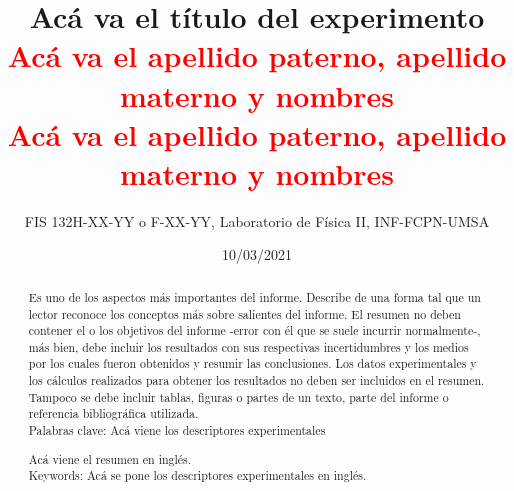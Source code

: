 \documentclass[11pt]{article}
\title{\textbf{Acá va el título del experimento}\\{\textcolor{red}{Acá va el apellido paterno, apellido materno y nombres\\Acá va el apellido paterno, apellido materno y nombres}}}
\author{FIS 132H-XX-YY o F-XX-YY, Laboratorio de Física II, INF-FCPN-UMSA}
\date{10/03/2021}
\begin{document}
\maketitle
{}
\begin{abstract}
\noindent Es uno de los aspectos más importantes del informe. Describe de una forma tal que un lector reconoce los conceptos más sobre salientes del informe. El resumen no deben contener el o los objetivos del informe -error con él que se suele incurrir normalmente-, más bien, debe incluir los resultados con sus respectivas incertidumbres y los medios por los cuales fueron obtenidos y resumir las conclusiones. Los datos experimentales y los cálculos realizados para obtener los resultados no deben ser incluidos en el resumen. Tampoco se debe incluir tablas, figuras o partes de un texto, parte del informe o referencia bibliográfica utilizada.\\
Palabras clave: Acá viene los descriptores experimentales
 \end{abstract}
\begin{abstract}
\noindent Acá viene el resumen en inglés.\\
Keywords: Acá se pone los descriptores experimentales en inglés.
\end{abstract}
\end{document}
